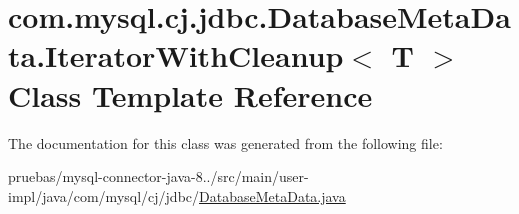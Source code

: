 \hypertarget{classcom_1_1mysql_1_1cj_1_1jdbc_1_1_database_meta_data_1_1_iterator_with_cleanup}{}\section{com.\+mysql.\+cj.\+jdbc.\+Database\+Meta\+Data.\+Iterator\+With\+Cleanup$<$ T $>$ Class Template Reference}
\label{classcom_1_1mysql_1_1cj_1_1jdbc_1_1_database_meta_data_1_1_iterator_with_cleanup}


The documentation for this class was generated from the following file\+:\begin{DoxyCompactItemize}
\item 
pruebas/mysql-\/connector-\/java-\/8../src/main/user-\/impl/java/com/mysql/cj/jdbc/\mbox{\hyperlink{_database_meta_data_8java}{Database\+Meta\+Data.\+java}}\end{DoxyCompactItemize}
